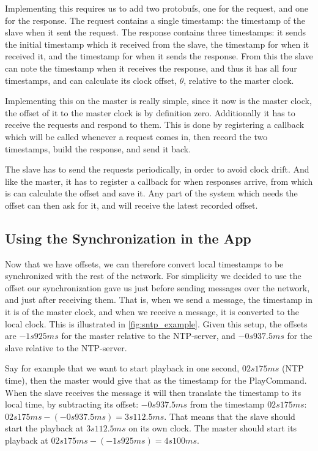 Implementing this requires us to add two protobufs, one for the request, and one for the response.
The request contains a single timestamp: the timestamp of the slave when it sent the request.
The response contains three timestamps: it sends the initial timestamp which it received from the slave, the timestamp for when it received it, and the timestamp for when it sends the response.
From this the slave can note the timestamp when it receives the response, and thus it has all four timestamps, and can calculate its clock offset, $\theta$, relative to the master clock.

Implementing this on the master is really simple, since it now is the master clock, the offset of it to the master clock is by definition zero.
Additionally it has to receive the requests and respond to them.
This is done by registering a callback which will be called whenever a request comes in, then record the two timestamps, build the response, and send it back.

The slave has to send the requests periodically, in order to avoid clock drift.
And like the master, it has to register a callback for when responses arrive, from which is can calculate the offset and save it.
Any part of the system which needs the offset can then ask for it, and will receive the latest recorded offset.

\subsection{Using the Synchronization in the App}
Now that we have offsets, we can therefore convert local timestamps to be synchronized with the rest of the network.
For simplicity we decided to use the offset our synchronization gave us just before sending messages over the network, and just after receiving them.
That is, when we send a message, the timestamp in it is of the master clock, and when we receive a message, it is converted to the local clock.
This is illustrated in \ref{fig:sntp_example}.
Given this setup, the offsets are $-1s925ms$ for the master relative to the \ac{NTP}-server, and $-0s937.5ms$ for the slave relative to the \ac{NTP}-server.

Say for example that we want to start playback in one second, $02s175ms$ (\ac{NTP} time), then the master would give that as the timestamp for the PlayCommand.
When the slave receives the message it will then translate the timestamp to its local time, by subtracting its offset:
$-0s937.5ms$ from the timestamp $02s175ms$: $02s175ms - (-0s937.5ms) = 3s112.5ms$.
That means that the slave should start the playback at $3s112.5ms$ on its own clock.
The master should start its playback at $02s175ms - (-1s925ms) = 4s100ms.$

